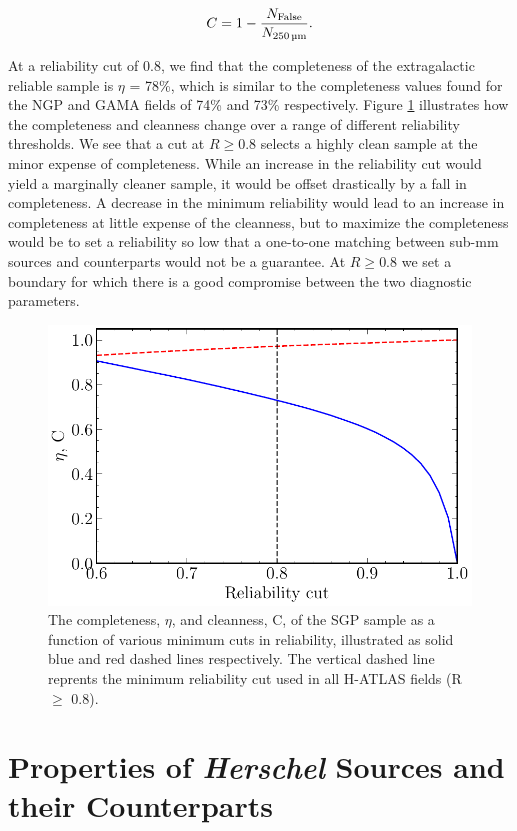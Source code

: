 \begin{equation}
    C = 1 - \frac{N_{\textrm{False}}}{N_{\textrm{250\,\micron}}}.
\label{eq:cleanness}
\end{equation}

At a reliability cut of 0.8, we find that the completeness of the extragalactic reliable sample is $\eta$ = 78\%, which is similar to the completeness values found for the NGP and GAMA fields of 74\% and 73\% respectively. Figure \ref{fig:completeness_and_cleanness} illustrates how the completeness and cleanness change over a range of different reliability thresholds. We see that a cut at $R \geq 0.8$ selects a highly clean sample at the minor expense of completeness. While an increase in the reliability cut would yield a marginally cleaner sample, it would be offset drastically by a fall in completeness. A decrease in the minimum reliability would lead to an increase in completeness at little expense of the cleanness, but to maximize the completeness would be to set a reliability so low that a one-to-one matching between sub-mm sources and counterparts would not be a guarantee. At $R \geq 0.8$ we set a boundary for which there is a good compromise between the two diagnostic parameters.

\begin{figure}
    \centering
	\includegraphics[width=0.75\columnwidth]{Figures/completeness_and_cleanness.pdf}
	\caption{The completeness, $\eta$, and cleanness, C, of the SGP sample as a function of various minimum cuts in reliability, illustrated as solid blue and red dashed lines respectively. The vertical dashed line reprents the minimum reliability cut used in all H-ATLAS fields (R $\geq$ 0.8).}
	\label{fig:completeness_and_cleanness}
\end{figure}

\section{Properties of \textit{Herschel} Sources and their Counterparts}

